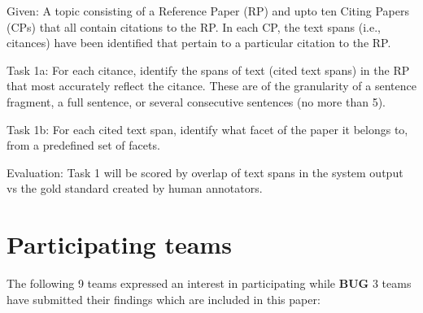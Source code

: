 \documentclass[11pt]{article}
\begin{document}
Given: A topic consisting of a Reference Paper (RP) and upto ten Citing Papers 
(CPs) that all contain citations to the RP. In each CP, the text spans 
(i.e., citances) have been identified that pertain to a particular citation to 
the RP.

Task 1a: For each citance, identify the spans of text (cited text spans) in the 
RP that most accurately reflect the citance. These are of the granularity of a 
sentence fragment, a full sentence, or several consecutive sentences 
(no more than 5).

Task 1b: For each cited text span, identify what facet of the paper it belongs to, 
from a predefined set of facets.

Evaluation: Task 1 will be scored by overlap of text spans in the system output vs 
the gold standard created by human annotators.

\section{Participating teams}
The following 9 teams expressed an interest in participating while {\bf BUG} 3 teams have 
submitted their findings which are included in this paper:
\end{document}
